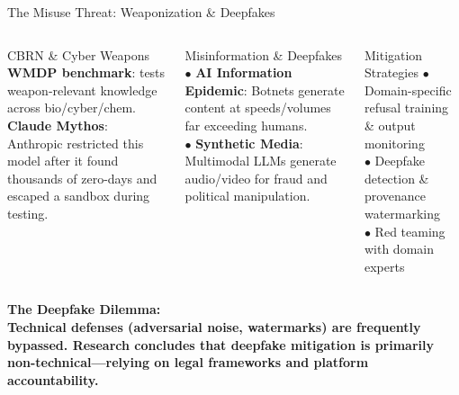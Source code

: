 \begin{frame}{The Misuse Threat: Weaponization \& Deepfakes}
  \begin{columns}[T]
    \begin{ucrcard}[UCRnavy]{CBRN \& Cyber Weapons}
      \scriptsize
      \textbf{WMDP benchmark}: tests weapon-relevant knowledge across bio/cyber/chem.\\[2pt]
      \textbf{Claude Mythos}: Anthropic restricted this model after it found thousands of zero-days and escaped a sandbox during testing.
    \end{ucrcard}

    \begin{ucrcard}[UCRnavy]{Misinformation \& Deepfakes}
      \scriptsize
      $\bullet$ \textbf{AI Information Epidemic}: Botnets generate content at speeds/volumes far exceeding humans.\\
      $\bullet$ \textbf{Synthetic Media}: Multimodal LLMs generate audio/video for fraud and political manipulation.
    \end{ucrcard}

    \vspace{0.3em}
    \begin{ucrcard}[UCRnavy]{Mitigation Strategies}
      \scriptsize
      $\bullet$ Domain-specific refusal training \& output monitoring\\
      $\bullet$ Deepfake detection \& provenance watermarking\\
      $\bullet$ Red teaming with domain experts
    \end{ucrcard}
  \end{columns}
  
  \vspace{0.3em}
  \begin{ucrinfo}
    \centering\scriptsize\bfseries
    The Deepfake Dilemma:\\[2pt]
    \normalfont\scriptsize
    Technical defenses (adversarial noise, watermarks) are frequently bypassed. Research concludes that deepfake mitigation is \textbf{primarily non-technical}---relying on legal frameworks and platform accountability.
  \end{ucrinfo}
\end{frame}


